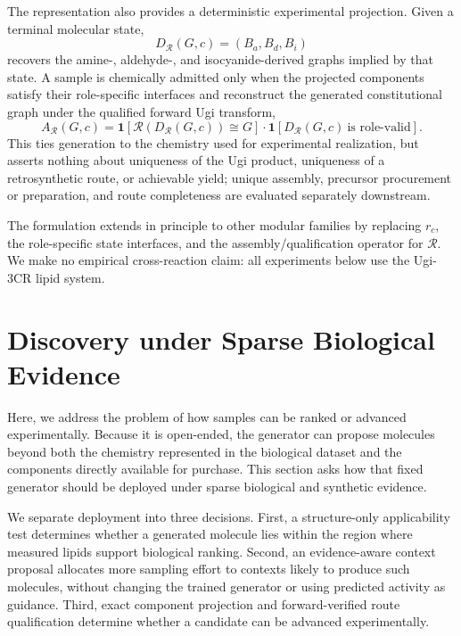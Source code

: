 \documentclass{article}
\newcommand{\rolemap}{\ensuremath{r_c}}
\newcommand{\decomp}{\ensuremath{D_{\mathcal{R}}}}
\begin{document}
The representation also provides a deterministic experimental projection. Given a terminal molecular
state,
%
\begin{equation}
\label{eq:decomp}
\decomp(G, c) = (B_a, B_d, B_i)
\end{equation}
%
recovers the amine-, aldehyde-, and isocyanide-derived graphs implied by that state. A sample is
chemically admitted only when the projected components satisfy their role-specific interfaces and
reconstruct the generated constitutional graph under the qualified forward Ugi transform,
%
\begin{equation}
\label{eq:admit}
A_{\mathcal{R}}(G, c)
= \mathbf{1}\!\left[ \mathcal{R}\!\left( \decomp(G, c) \right) \cong G \right]
\cdot \mathbf{1}\!\left[ \decomp(G, c) \ \text{is role-valid} \right].
\end{equation}
%
This ties generation to the chemistry used for experimental realization, but asserts nothing about
uniqueness of the Ugi product, uniqueness of a retrosynthetic route, or achievable yield; unique
assembly, precursor procurement or preparation, and route completeness are evaluated separately
downstream.

The formulation extends in principle to other modular families by replacing \rolemap{}, the
role-specific state interfaces, and the assembly/qualification operator for $\mathcal{R}$. We make no
empirical cross-reaction claim: all experiments below use the Ugi-3CR lipid system.

\section{Discovery under Sparse Biological Evidence}
\label{sec:deployment}

Here, we address the problem of how samples can be ranked or advanced experimentally. Because it is
open-ended, the generator can propose molecules beyond both the chemistry represented in the
biological dataset and the components directly available for purchase. This section asks how that
fixed generator should be deployed under sparse biological and synthetic evidence.

We separate deployment into three decisions. First, a structure-only applicability test determines
whether a generated molecule lies within the region where measured lipids support biological ranking.
Second, an evidence-aware context proposal allocates more sampling effort to contexts likely to
produce such molecules, without changing the trained generator or using predicted activity as
guidance. Third, exact component projection and forward-verified route qualification determine
whether a candidate can be advanced experimentally. 
\end{document}
